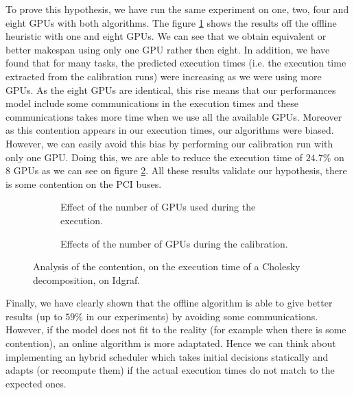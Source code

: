 \documentclass[10pt, conference, compsocconf,pdftex,dvipsnames]{IEEEtran}
\begin{document}
To prove this hypothesis, we have run the same experiment on one, two, four
and eight GPUs with both algorithms. The figure \ref{fig:ContentionGpu} shows
the results off the offline heuristic with one and eight GPUs. We can see that
we obtain equivalent or better makespan using only one GPU rather then eight.
In addition, we have found that for many tasks, the predicted execution times
(i.e. the execution time extracted from the calibration runs) were increasing
as we were using more GPUs. As the eight GPUs are identical, this rise means
that our performances model include some communications in the execution times
and these communications takes more time when we use all the available GPUs.
Moreover as this contention appears in our execution times, our algorithms
were biased. However, we can easily avoid this bias by performing our
calibration run with only one GPU. Doing this, we are able to reduce the
execution time of $24.7\%$ on 8 GPUs as we can see on figure
\ref{fig:ContentionTrick}. All these results validate our hypothesis, there is
some contention on the PCI buses.

\begin{figure}[htb]
    \centering
    \begin{subfigure}{0.5\textwidth}
        \scalebox{0.6}{
            
        }
        \caption{Effect of the number of GPUs used during the execution.}
        \label{fig:ContentionGpu}
    \end{subfigure}
    \begin{subfigure}{0.5\textwidth}
        \scalebox{0.6}{
            \centering
            
        }
        \caption{Effects of the number of GPUs during the calibration.}
        \label{fig:ContentionTrick}
    \end{subfigure}
    \label{fig:Contention}
    \caption{Analysis of the contention, on the execution time of a 
    Cholesky decomposition, on Idgraf.}

\end{figure}

Finally, we have clearly shown that the offline algorithm is able to give
better results (up to $59\%$ in our experiments) by avoiding some
communications. However, if the model does not fit to the reality (for example
when there is some contention), an online algorithm is more adaptated. Hence
we can think about implementing an hybrid scheduler which takes initial
decisions statically and adapts (or recompute them) if the actual execution
times do not match to the expected ones.
\end{document}
